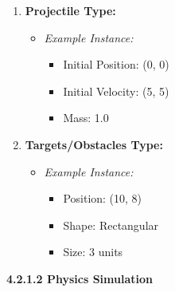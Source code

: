 \documentclass[
]{article}
\begin{document}
\begin{enumerate}
\def\labelenumi{\arabic{enumi}.}
\item
  \textbf{Projectile Type:}

  \begin{itemize}
  \item
    \emph{Example Instance:}

    \begin{itemize}
    \item
      Initial Position: (0, 0)
    \item
      Initial Velocity: (5, 5)
    \item
      Mass: 1.0
    \end{itemize}
  \end{itemize}
\item
  \textbf{Targets/Obstacles Type:}

  \begin{itemize}
  \item
    \emph{Example Instance:}

    \begin{itemize}
    \item
      Position: (10, 8)
    \item
      Shape: Rectangular
    \item
      Size: 3 units
    \end{itemize}
  \end{itemize}
\end{enumerate}

\textbf{4.2.1.2 Physics Simulation}
\end{document}
